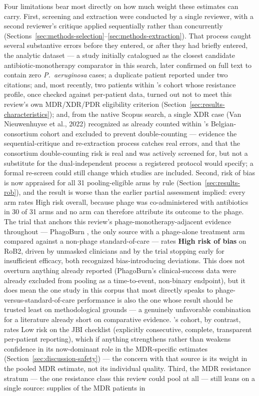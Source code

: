 Four limitations bear most directly on how much weight these estimates can carry. First, screening and extraction were conducted by a single reviewer, with a second reviewer's critique applied sequentially rather than concurrently (Sections~\ref{sec:methods-selection}--\ref{sec:methods-extraction}). That process caught several substantive errors before they entered, or after they had briefly entered, the analytic dataset --- a study initially catalogued as the closest candidate antibiotic-monotherapy comparator in this search, later confirmed on full text to contain zero \textit{P.\ aeruginosa} cases; a duplicate patient reported under two citations; and, most recently, two patients within \citeauthor{Pirnay2024_natmicrobiol}'s cohort whose resistance profile, once checked against per-patient data, turned out not to meet this review's own MDR/XDR/PDR eligibility criterion (Section~\ref{sec:results-characteristics}); and, from the native Scopus search, a single XDR case (Van Nieuwenhuyse et al., 2022) recognized as already counted within \citeauthor{Pirnay2024_natmicrobiol}'s Belgian-consortium cohort and excluded to prevent double-counting --- evidence the sequential-critique and re-extraction process catches real errors, and that the consortium double-counting risk is real and was actively screened for, but not a substitute for the dual-independent process a registered protocol would specify; a formal re-screen could still change which studies are included. Second, risk of bias is now appraised for all 31 pooling-eligible arms by rule (Section~\ref{sec:results-rob}), and the result is worse than the earlier partial assessment implied: every arm rates High risk overall, because phage was co-administered with antibiotics in 30 of 31 arms and no arm can therefore attribute its outcome to the phage. The trial that anchors this review's phage-monotherapy-adjacent evidence throughout --- PhagoBurn \parencite{Jault2019_phagoburn}, the only source with a phage-alone treatment arm compared against a non-phage standard-of-care --- rates \textbf{High risk of bias} on RoB2, driven by unmasked clinicians and by the trial stopping early for insufficient efficacy, both recognized bias-introducing deviations. This does not overturn anything already reported (PhagoBurn's clinical-success data were already excluded from pooling as a time-to-event, non-binary endpoint), but it does mean the one study in this corpus that most directly speaks to phage-versus-standard-of-care performance is also the one whose result should be trusted least on methodological grounds --- a genuinely unfavorable combination for a literature already short on comparative evidence. \citeauthor{Pirnay2024_natmicrobiol}'s cohort, by contrast, rates Low risk on the JBI checklist (explicitly consecutive, complete, transparent per-patient reporting), which if anything strengthens rather than weakens confidence in its now-dominant role in the MDR-specific estimates (Section~\ref{sec:discussion-safety}) --- the concern with that source is its weight in the pooled MDR estimate, not its individual quality. Third, the MDR resistance stratum --- the one resistance class this review could pool at all --- still leans on a single source: \citeauthor{Pirnay2024_natmicrobiol} supplies \PirnayNMDRCs of the \PoolNMDRCs MDR patients in 